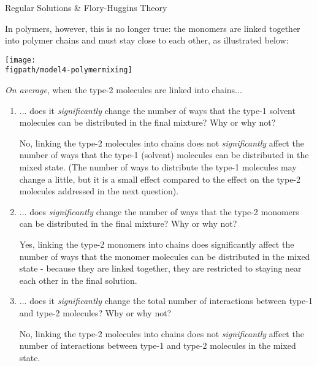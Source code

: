 \begin{activity}{Regular Solutions \& Flory-Huggins Theory}
\begin{model}
In polymers, however, this is no longer true: the monomers are linked together into polymer chains and must stay close to each other, as illustrated below: 
	
	\centerline{\texttt{[image: \\figpath/model4-polymermixing]}}

\end{model}

\begin{ctqs}

	\question \emph{On average}, when the type-2 molecules are linked into chains...
	
		\begin{enumerate}
			\item ... does it \emph{significantly} change the number of ways that the type-1 solvent molecules can be distributed in the final mixture?  Why or why not?
				\label{\labelbase:ctq:FHtype1}
			
				\begin{solution}[1in]
					No, linking the type-2 molecules into chains does not \emph{significantly} affect the number of ways that the type-1 (solvent) molecules can be distributed in the mixed state.  (The number of ways to distribute the type-1 molecules may change a little, but it is a small effect compared to the effect on the type-2 molecules addressed in the next question).
				\end{solution}
			
			\item ... does \emph{significantly} change the number of ways that the type-2 monomers can be distributed in the final mixture?  Why or why not?
				\label{\labelbase:ctq:FHtype2}
			
				\begin{solution}[0.9in]
					Yes, linking the type-2 monomers into chains does  significantly affect the number of ways that the monomer molecules can be distributed in the mixed state - because they are linked together, they are restricted to staying near each other in the final solution.
				\end{solution}
			
			\item ... does it \emph{significantly} change the total number of interactions between type-1 and type-2 molecules?  Why or why not?
				\label{\labelbase:ctq:FHinteraction}
			
				\begin{solution}[0.9in]
					No, linking the type-2 molecules into chains does not \emph{significantly} affect the number of interactions between type-1 and type-2 molecules in the mixed state.
				\end{solution}
				

\end{enumerate}
\end{ctqs}
\end{activity}
